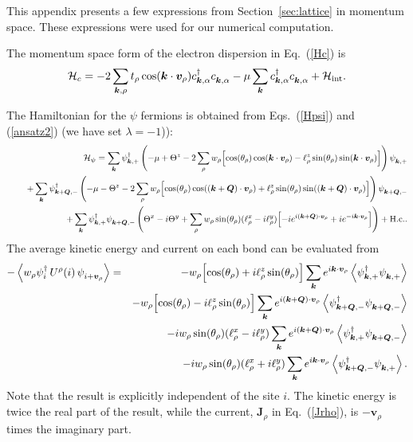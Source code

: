 \documentclass[aps,prb,preprint,onecolumn,citeautoscript,superscriptaddress,footinbib,
eqsecnum]{revtex4-1}
\newcommand{\beq}{\begin{equation}}
\newcommand{\eeq}{\end{equation}}
\def\bea{\begin{eqnarray}}
\def\eea{\end{eqnarray}}
\newcommand{\nn}{\nonumber \\}
\begin{document}
This appendix presents a few expressions from Section~\ref{sec:lattice} in momentum space. These expressions were used for our numerical 
computation.

The momentum space form of the electron dispersion in Eq.~(\ref{Hc}) is
\beq
\mathcal{H}_c = -  2\sum_{{\bm k},\rho} t_\rho  \cos( {\bm k} \cdot {\bm v}_\rho ) c_{{\bm k}, \alpha}^\dagger c_{{\bm k}, \alpha}^{\vphantom \dagger}
- \mu \sum_{{\bm k}} c_{{\bm k}, \alpha}^\dagger c_{{\bm k}, \alpha}^{\vphantom \dagger}  + \mathcal{H}_{\rm int}.
\eeq

The Hamiltonian for the $\psi$ fermions is obtained from Eqs.~(\ref{Hpsi}) and (\ref{ansatz2}) (we have set $\lambda =-1$)):
\bea
&& \mathcal{H}_\psi = \sum_{{\bm k}} \psi_{{\bm k},+}^\dagger \left(- \mu + \Theta^z  - 2 \sum_\rho w_\rho \Bigl[
\cos(\theta_\rho)  \cos( {\bm k} \cdot {\bm v}_\rho ) - \ell_\rho^z  \sin(\theta_\rho) \sin( {\bm k} \cdot {\bm v}_\rho  ) \Bigr] \right)  \psi_{{\bm k},+}^{\vphantom \dagger} \nn
&& ~~~~+ \sum_{{\bm k}} \psi_{{\bm k}+{\bm Q},-}^\dagger \left(- \mu - \Theta^z - 2 \sum_\rho w_\rho \Bigl[
\cos(\theta_\rho)  \cos( ({\bm k}+{\bm Q}) \cdot {\bm v}_\rho ) + \ell_\rho^z  \sin(\theta_\rho) \sin( ({\bm k}+{\bm Q}) \cdot {\bm v}_\rho  ) \Bigr] \right)  \psi_{{\bm k}+{\bm Q},-}^{\vphantom \dagger} \nn
&&+ \sum_{{\bm k}}  \psi_{{\bm k},+}^\dagger \psi_{{\bm k} + {\bm Q},-}^{\vphantom \dagger}\left( \Theta^x - i \Theta^y + \sum_\rho w_\rho \sin (\theta_\rho) (\ell_\rho^x - i \ell_\rho^y)
\Bigl[- i e^{i ({\bm k} + {\bm Q}) \cdot {\bm v}_\rho} + i e^{-i{\bm k}\cdot {\bm v}_\rho} \Bigr] \right)
+ \mbox{H.c.}.
\eea
The average kinetic energy and current on each bond can be evaluated from
\bea 
-\left\langle w_\rho  \psi_{i}^\dagger \, U^\rho (i) \, \psi_{i + {\bm v}_\rho}^{\vphantom \dagger} \right\rangle &=& 
-w_\rho \Bigl[
\cos(\theta_\rho)  + i \ell_\rho^z  \sin(\theta_\rho) \Bigr] \sum_{{\bm k}} e^{i {\bm k} \cdot {\bm v}_\rho}  
 \left\langle \psi_{{\bm k},+}^\dagger \psi_{{\bm k},+}^{\vphantom \dagger} \right\rangle \nn
 &~& -w_\rho \Bigl[
\cos(\theta_\rho)  - i \ell_\rho^z  \sin(\theta_\rho) \Bigr] \sum_{{\bm k}} e^{i ({\bm k} + {\bm Q}) \cdot {\bm v}_\rho}  
 \left\langle \psi_{{\bm k}+{\bm Q},-}^\dagger \psi_{{\bm k}+{\bm Q},-}^{\vphantom \dagger} \right\rangle \nn
&~& - i w_\rho \sin (\theta_\rho) (\ell_\rho^x - i \ell_\rho^y) \sum_{{\bm k}} e^{i ({\bm k} + {\bm Q}) \cdot {\bm v}_\rho}
\left\langle \psi_{{\bm k},+}^\dagger  \psi_{{\bm k} + {\bm Q},-}^{\vphantom \dagger} \right\rangle \nn
&~& - i w_\rho \sin (\theta_\rho) (\ell_\rho^x + i \ell_\rho^y) \sum_{{\bm k}} e^{i {\bm k} \cdot {\bm v}_\rho}
\left\langle \psi_{{\bm k}+ {\bm Q},-}^\dagger  \psi_{{\bm k},+ }^{\vphantom \dagger} \right\rangle.
\eea
Note that the result is explicitly independent of the site $i$.
The kinetic energy is twice the real part of the result, while the current, ${\bm J}_\rho$ in Eq.~(\ref{Jrho}), is $-{\bm v}_\rho$ times the imaginary part.
\end{document}
